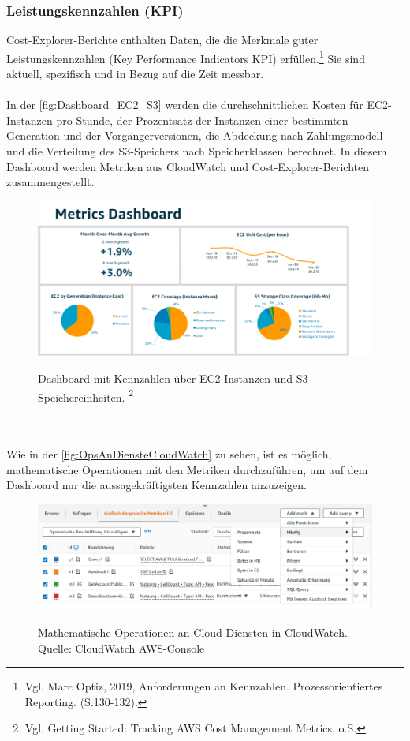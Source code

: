 \subsubsection*{Leistungskennzahlen (KPI)}
Cost-Explorer-Berichte enthalten Daten, die die Merkmale guter Leistungskennzahlen (Key Performance Indicators KPI) erfüllen.\footnote{Vgl. Marc Optiz, 2019, Anforderungen an Kennzahlen. Prozessorientiertes Reporting. (S.130-132).\cite{PR1}} Sie sind aktuell, spezifisch und in Bezug auf die Zeit messbar.
\\\\
In der \autoref{fig:Dashboard_EC2_S3} werden %
die durchschnittlichen Kosten für EC2-Instanzen pro Stunde, der Prozentsatz der Instanzen einer bestimmten Generation und der Vorgängerversionen, die Abdeckung nach Zahlungsmodell und die Verteilung des S3-Speichers nach Speicherklassen berechnet. In diesem Dashboard werden Metriken aus CloudWatch und Cost-Explorer-Berichten zusammengestellt.
\begin{figure}[h!]
  \centering
  \includegraphics[scale=0.65]{sources/Dashboard_EC2_S3}
  \caption[Dashboard mit EC2 und S3 Metriken]{}
  \label{fig:Dashboard_EC2_S3} 
  Dashboard mit Kennzahlen über EC2-Instanzen und S3-Speichereinheiten. \footnote{Vgl. Getting Started: Tracking AWS Cost Management Metrics. o.S.\cite{AMZ35}}
\end{figure}
\\\\
Wie in der \autoref{fig:OpsAnDiensteCloudWatch} zu sehen, ist es möglich, mathematische Operationen mit den Metriken durchzuführen, um auf dem Dashboard nur die aussagekräftigsten Kennzahlen anzuzeigen.
\begin{figure}[h!]
  \centering
  \includegraphics[scale=0.55]{sources/OpsAnDiensteCloudWatch}
  \caption[Operationen an Cloud-Diensten in CloudWatch]{}
  \label{fig:OpsAnDiensteCloudWatch} 
  Mathematische Operationen an Cloud-Diensten in CloudWatch.\\
  Quelle: CloudWatch AWS-Console
\end{figure}
